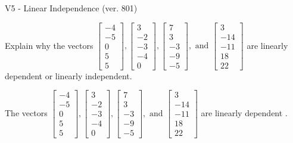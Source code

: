 \begin{exercise}
  \begin{exerciseTitle}V5 - Linear Independence (ver. 801)\end{exerciseTitle}
  \begin{exerciseStatement}
    Explain why the vectors \(\left[\begin{array}{r}
-4 \\
-5 \\
0 \\
5 \\
5
\end{array}\right] , \left[\begin{array}{r}
3 \\
-2 \\
-3 \\
-4 \\
0
\end{array}\right] , \left[\begin{array}{r}
7 \\
3 \\
-3 \\
-9 \\
-5
\end{array}\right] , \text{ and } \left[\begin{array}{r}
3 \\
-14 \\
-11 \\
18 \\
22
\end{array}\right]\) are linearly dependent or linearly independent.	


  \end{exerciseStatement}
  \begin{exerciseAnswer}
   The vectors \(\left[\begin{array}{r}
-4 \\
-5 \\
0 \\
5 \\
5
\end{array}\right] , \left[\begin{array}{r}
3 \\
-2 \\
-3 \\
-4 \\
0
\end{array}\right] , \left[\begin{array}{r}
7 \\
3 \\
-3 \\
-9 \\
-5
\end{array}\right] , \text{ and } \left[\begin{array}{r}
3 \\
-14 \\
-11 \\
18 \\
22
\end{array}\right]\) are 
  	 linearly dependent  .
  


  \end{exerciseAnswer}
\end{exercise}